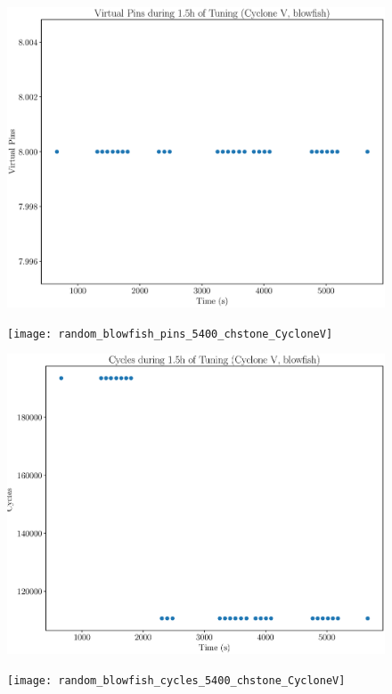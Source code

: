 \documentclass[12pt, a4paper]{article}
\begin{document}
\begin{figure}[htpb]
    \begin{minipage}{.48\textwidth}
        \includegraphics[scale=.25]{blowfish_pins_5400_chstone_CycloneV}
    \end{minipage}%
    \hfill
    \begin{minipage}{.48\textwidth}
        \texttt{[image: random\_blowfish\_pins\_5400\_chstone\_CycloneV]}
    \end{minipage}%

    \begin{minipage}{.48\textwidth}
        \includegraphics[scale=.25]{blowfish_cycles_5400_chstone_CycloneV}
    \end{minipage}%
    \hfill
    \begin{minipage}{.48\textwidth}
        \texttt{[image: random\_blowfish\_cycles\_5400\_chstone\_CycloneV]}
    \end{minipage}%
\end{figure}
\end{document}
